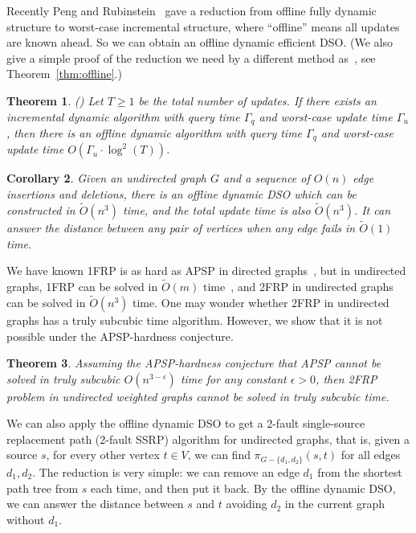 \documentclass[11pt]{article}
\theoremstyle{plain}
\newtheorem{theorem}{Theorem}[section]
\newtheorem{corollary}[theorem]{Corollary}
\theoremstyle{definition}
\begin{document}
Recently Peng and Rubinstein~\cite{peng2023fully} gave a reduction from offline fully dynamic structure to worst-case incremental structure, where ``offline'' means all updates are known ahead. So we can obtain an offline dynamic efficient DSO. (We also give a simple proof of the reduction we need by a different method as~\cite{peng2023fully}, see Theorem~\ref{thm:offline}.)

\begin{theorem} (\cite{peng2023fully})
    Let $T \geq 1$ be the total number of updates. If there exists an incremental dynamic algorithm with query time $\Gamma_q$ and worst-case update time $\Gamma_u$, then there is an offline dynamic algorithm with query time $\Gamma_q$ and worst-case update time $O(\Gamma_u \cdot \log^2(T))$.
\end{theorem}

\begin{corollary}\label{cor:dynamic}
    Given an undirected graph $G$ and a sequence of $O(n)$ edge insertions and deletions, there is an offline dynamic DSO which can be constructed in $\tilde{O}(n^3)$ time, and the total update time is also $\tilde{O}(n^3)$. It can answer the distance between any pair of vertices when any edge fails in $\tilde{O}(1)$ time.
\end{corollary}

We have known 1FRP is as hard as APSP in directed graphs~\cite{WW18}, but in undirected graphs, 1FRP can be solved in $\tilde{O}(m)$ time~\cite{NPW01}, and 2FRP in undirected graphs can be solved in $\tilde{O}(n^3)$ time. One may wonder whether 2FRP in undirected graphs has a truly subcubic time algorithm. However, we show that it is not possible under the APSP-hardness conjecture.

\begin{theorem}
    Assuming the APSP-hardness conjecture that APSP cannot be solved in truly subcubic $O(n^{3-\epsilon})$ time for any constant $\epsilon>0$, then 2FRP problem in undirected weighted graphs cannot be solved in truly subcubic time.
\end{theorem}


We can also apply the offline dynamic DSO to get a 2-fault single-source replacement path (2-fault SSRP) algorithm for undirected graphs, that is, given a source $s$, for every other vertex $t\in V$, we can find $\pi_{G-\{d_1,d_2\}}(s,t)$ for all edges $d_1,d_2$. The reduction is very simple: we can remove an edge $d_1$ from the shortest path tree from $s$ each time, and then put it back. By the offline dynamic DSO, we can answer the distance between $s$ and $t$ avoiding $d_2$ in the current graph without $d_1$.
\end{document}
